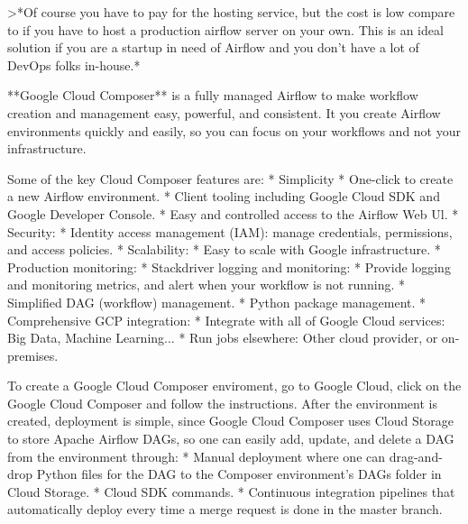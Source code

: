 >*Of course you have to pay for the hosting service, but the cost is low compare to if you have to host a production
airflow server on your own. This is an ideal solution if you are a startup in need of Airflow and you don't have a
lot of DevOps folks in-house.*

**Google Cloud Composer** is a fully managed Airflow to make workflow creation and management easy, powerful, and
consistent. It you create Airflow environments quickly and easily, so you can focus on your workflows and not your
infrastructure.

Some of the key Cloud Composer features are:
* Simplicity
    * One-click to create a new Airflow environment.
    * Client tooling including Google Cloud SDK and Google Developer Console.
    * Easy and controlled access to the Airflow Web Ul.
* Security:
    * Identity access management (IAM): manage credentials, permissions, and access policies.
* Scalability:
    * Easy to scale with Google infrastructure.
* Production monitoring:
    * Stackdriver logging and monitoring:
        * Provide logging and monitoring metrics, and alert when your workflow is not running.
    * Simplified DAG (workflow) management.
    * Python package management.
* Comprehensive GCP integration:
    * Integrate with all of Google Cloud services: Big Data, Machine Learning...
    * Run jobs elsewhere: Other cloud provider, or on-premises.

To create a Google Cloud Composer enviroment, go to Google Cloud, click on the Google Cloud Composer and follow the instructions. After the environment is created, deployment is simple, since Google Cloud Composer uses Cloud Storage to store Apache Airflow DAGs, so one can easily add, update, and delete a DAG from the environment through:
* Manual deployment where one can drag-and-drop Python files for the DAG to the Composer environment's DAGs folder in Cloud Storage.
* Cloud SDK commands.
* Continuous integration pipelines that automatically deploy every time a merge request is done in the master branch.